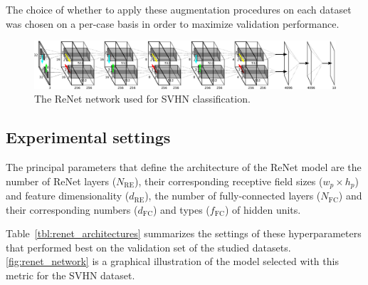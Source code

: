 The choice of whether to apply these augmentation procedures on each dataset
was chosen on a per-case basis in order to maximize validation performance.

\begin{figure}[t]
    \centering
    \includegraphics[height=.14\textheight,width=\columnwidth]{img/renet/renet_svhn.pdf}
    \caption{The ReNet network used for SVHN classification.}
    \label{fig:renet_network}
\end{figure}

\subsection{Experimental settings}

The principal parameters that define the architecture of the ReNet model are
the number of ReNet layers ($N_{\text{RE}}$), their corresponding receptive
field sizes ($w_p \times h_p$) and feature dimensionality ($d_{\text{RE}}$),
the number of fully-connected layers ($N_{\text{FC}}$) and their corresponding
numbers ($d_{\text{FC}}$) and types ($f_{\text{FC}}$) of hidden units.

Table~\ref{tbl:renet_architectures} summarizes the settings of these
hyperparameters that performed best on the validation set of the studied
datasets. \autoref{fig:renet_network} is a graphical illustration of the model
selected with this metric for the SVHN dataset.

